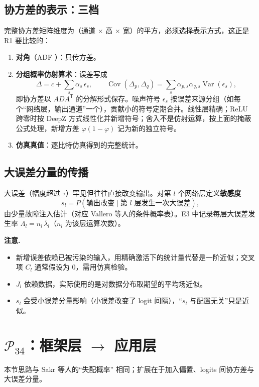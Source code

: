 \documentclass[11pt,a4paper]{ctexart}
\DeclareMathOperator{\Var}{Var}
\DeclareMathOperator{\Cov}{Cov}
\newenvironment{caution}{\par\medskip\noindent\textbf{注意.}\ }{\par\medskip}
\begin{document}
\subsection{协方差的表示：三档}
完整协方差矩阵维度为（通道 $\times$ 高 $\times$ 宽）的平方，必须选择表示方式，这正是 R1 要比较的：
\begin{enumerate}[leftmargin=*]
  \item \textbf{对角}（ADF \cite{gast2018}）：只传方差。
  \item \textbf{分组概率仿射算术}：误差写成
  \begin{equation}
  \Delta = c + \sum_{s} \alpha_s\,\epsilon_s,\qquad \Cov(\Delta_p,\Delta_q) = \sum_s \alpha_{p,s}\alpha_{q,s}\Var(\epsilon_s),
  \end{equation}
  即协方差以 $A D A^{\mathsf T}$ 的分解形式保存。噪声符号 $\epsilon_s$ 按误差来源分组（如每个“网络层，输出通道”一个），贡献小的符号定期合并。线性层精确；ReLU 跨零时按 DeepZ 方式线性化并新增符号；舍入不是仿射运算，按上面的掩蔽公式处理，新增方差 $\varphi(1-\varphi)$ 记为新的独立符号。
  \item \textbf{仿真真值}：逐比特仿真得到的完整统计。
\end{enumerate}

\subsection{大误差分量的传播}
大误差（幅度超过 $\tau$）罕见但往往直接改变输出。对第 $l$ 个网络层定义\textbf{敏感度}
\begin{equation}
s_l = P(\text{输出改变} \mid \text{第 } l \text{ 层发生一次大误差}),
\end{equation}
由少量故障注入估计（对应 Vallero 等人的条件概率表）。E3 中记录每层大误差发生率 $\Lambda_l = n_l\,\bar\lambda_l$（$n_l$ 为该层运算次数）。

\begin{caution}
\begin{itemize}[leftmargin=*]
  \item 新增误差依赖已被污染的输入，用精确激活下的统计量代替是一阶近似；交叉项 $C_l$ 通常假设为 0，需用仿真检验。
  \item $J_l$ 依赖数据，实际使用的是对数据分布取期望的平均场近似。
  \item $s_l$ 会受小误差分量影响（小误差改变了 logit 间隔），“$s_l$ 与配置无关”只是近似。
\end{itemize}
\end{caution}

\section{$\mathcal{P}_{34}$：框架层 $\to$ 应用层}
本节思路与 Sakr 等人的“失配概率” \cite{sakr2017} 相同；扩展在于加入偏置、logits 间协方差与大误差分量。
\end{document}
